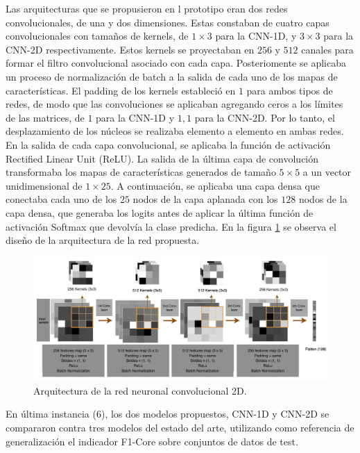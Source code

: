 \documentclass{uathesis-es}
\begin{document}
	Las arquitecturas que se propusieron en l prototipo eran dos redes convolucionales, de una y dos dimensiones. Estas constaban de cuatro capas convolucionales con tamaños de kernels, de $1 \times 3$ para la CNN-1D, y $3 \times 3$ para la CNN-2D respectivamente. Estos kernels se proyectaban en $256$ y $512$ canales para formar el filtro convolucional asociado con cada capa. Posteriomente se aplicaba un proceso de normalización de batch a la salida de cada uno de los mapas de características. El padding de los kernels estableció en $1$ para ambos tipos de redes, de modo que las convoluciones se aplicaban agregando ceros a los límites de las matrices, de $1$ para la CNN-1D y ${1, 1}$ para la CNN-2D. Por lo tanto, el desplazamiento de los núcleos se realizaba elemento a elemento en ambas redes. En la salida de cada capa convolucional, se aplicaba la función de activación Rectified Linear Unit  (ReLU). La salida de la última capa de convolución transformaba los mapas de características generados de tamaño $5 \times 5$ a un vector unidimensional de $1 \times 25$. A continuación, se aplicaba una capa densa que conectaba cada uno de los $25$ nodos de la capa aplanada con los $128$ nodos de la capa densa, que generaba los logits antes de aplicar la última función de activación Softmax que devolvía la clase predicha. En la figura \ref{TASPCNNIMAGE} se observa el diseño de la arquitectura de la red propuesta.
	
	\begin{figure}[H]
		\centering
		\includegraphics[width=15cm]{Figures/1stPaper/TASPCNN.png}
		\caption{Arquitectura de la red neuronal convolucional 2D.}
		\label{TASPCNNIMAGE}
	\end{figure}
	
	En última instancia (6), los dos modelos propuestos, CNN-1D y CNN-2D se compararon contra tres modelos del estado del arte, utilizando como referencia de generalización el indicador F1-Core sobre conjuntos de datos de test.
	
\end{document}
